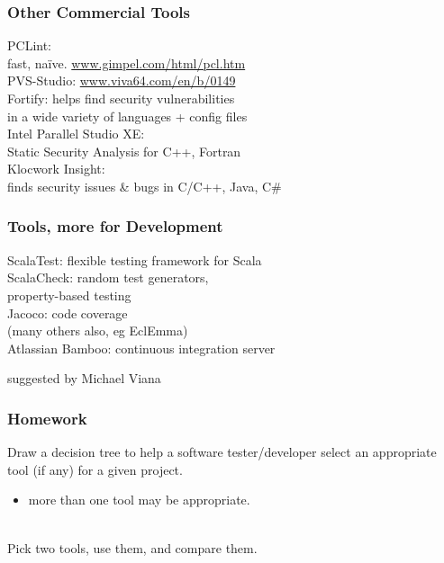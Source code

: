 \documentclass{beamer}
\newenvironment{changemargin}[1]{%
  \begin{list}{}{%
    \setlength{\topsep}{0pt}%
    \setlength{\leftmargin}{#1}%
    \setlength{\rightmargin}{1em}
    \setlength{\listparindent}{\parindent}%
    \setlength{\itemindent}{\parindent}%
    \setlength{\parsep}{\parskip}%
  }%
  \item[]}{\end{list}}
\begin{document}
\begin{frame}
  \frametitle{Other Commercial Tools}
  \begin{changemargin}{2cm}
    PCLint: \\ \hspace*{1em} fast, na\"ive. \url{www.gimpel.com/html/pcl.htm}\\[1em]
    PVS-Studio: \url{www.viva64.com/en/b/0149}\\[1em]
    Fortify: helps find security vulnerabilities \\
    \hspace*{1em} in a wide variety of languages + config files\\[1em]
    Intel Parallel Studio XE: \\ \hspace*{1em} Static Security Analysis for C++, Fortran\\[1em]
    Klocwork Insight: \\ \hspace*{1em} finds security issues \& bugs in C/C++, Java, C\#
  \end{changemargin}
\end{frame}

\begin{frame}
  \frametitle{Tools, more for Development}
  \begin{changemargin}{2cm}
    ScalaTest: flexible testing framework for Scala\\[1em]
    ScalaCheck: random test generators, \\
    \hspace*{2em}property-based testing\\[1em]
    Jacoco: code coverage \\
    \hspace*{2em} (many others also, eg EclEmma)\\[1em]
    Atlassian Bamboo: continuous integration server
  \end{changemargin}
  \hfill \scriptsize suggested by Michael Viana
\end{frame}

\begin{frame}
  \frametitle{Homework}
  \begin{changemargin}{2cm}
    Draw a decision tree to help a software tester/developer select an appropriate tool (if any) for a given project.\\[1em]
    \begin{itemize}
    \item more than one tool may be appropriate.
    \end{itemize}
    ~\\[1em]
    Pick two tools, use them, and compare them.
  \end{changemargin}
\end{frame}
    
\end{document}
